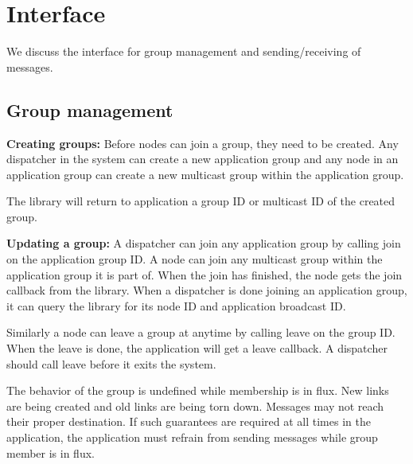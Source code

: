 \documentclass[a4paper,twoside]{report} %
\begin{document}
\section{Interface}
We discuss the interface for group management and sending/receiving of messages.

\subsection{Group management}

\textbf{Creating groups:}
Before nodes can join a group, they need to be created.
Any dispatcher in the system can create a new application group
and any node in an application group can create a new multicast group
within the application group.

The library will return to application a group ID or
multicast ID of the created group.

\textbf{Updating a group:}
A dispatcher can join any application group by calling join on
the application group ID.
A node can join any multicast group within the application group it is part of.
When the join has finished, the node gets the join callback from the library.
When a dispatcher is done joining an application group,
it can query the library for its node ID and application broadcast ID.

Similarly a node can leave a group at anytime by calling leave on the group ID.
When the leave is done, the application will get a leave callback.
A dispatcher should call leave before it exits the system.

The behavior of the group is undefined while membership is in flux.
New links are being created and old links are being torn down.
Messages may not reach their proper destination.
If such guarantees are required at all times in the application,
the application must refrain from sending messages while
group member is in flux.

\end{document}
